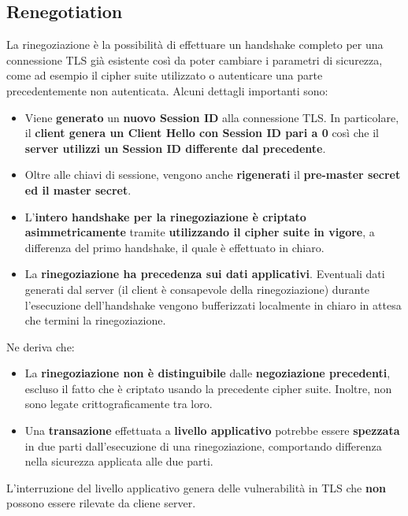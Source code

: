 \subsection{Renegotiation}
La rinegoziazione è la possibilità di effettuare un handshake completo per una connessione TLS già esistente così da poter cambiare i parametri di sicurezza, come ad esempio il cipher suite utilizzato o autenticare una parte precedentemente non autenticata. Alcuni dettagli importanti sono:
\begin{definition}\label{def:renegotiation}
\begin{itemize}
    \item Viene \textbf{generato} un \textbf{nuovo Session ID} alla connessione TLS. In particolare, il \textbf{client genera un Client Hello con Session ID pari a 0} così che il \textbf{server utilizzi un Session ID differente dal precedente}.
    \item Oltre alle chiavi di sessione, vengono anche \textbf{rigenerati} il \textbf{pre-master secret ed il master secret}.
    \item L’\textbf{intero handshake per la rinegoziazione è criptato asimmetricamente} tramite \textbf{utilizzando il cipher suite in vigore}, a differenza del primo handshake, il quale è effettuato in chiaro.
    \item La\textbf{ rinegoziazione ha precedenza sui dati applicativi}. Eventuali dati generati dal server (il client è consapevole della rinegoziazione) durante l’esecuzione dell’handshake vengono bufferizzati localmente in chiaro in attesa che termini la rinegoziazione.
\end{itemize}
\end{definition}
Ne deriva che:
\begin{itemize}
    \item La \textbf{rinegoziazione non è distinguibile} dalle \textbf{negoziazione precedenti}, escluso il fatto che è criptato usando la precedente cipher suite. Inoltre, non sono legate crittograficamente tra loro.
    \item Una \textbf{transazione} effettuata a \textbf{livello applicativo} potrebbe essere \textbf{spezzata} in due parti dall'esecuzione di una rinegoziazione, comportando differenza nella sicurezza applicata alle due parti.
\end{itemize}
\begin{remark}
L'interruzione del livello applicativo genera delle vulnerabilità in TLS che \textbf{non} possono essere rilevate da cliene server.
\end{remark}

